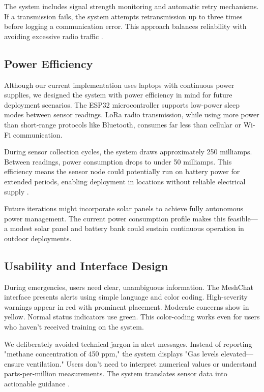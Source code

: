 The system includes signal strength monitoring and automatic retry mechanisms. If a transmission fails, the system attempts retransmission up to three times before logging a communication error. This approach balances reliability with avoiding excessive radio traffic \cite{adelantado2017understanding}.

\subsection{Power Efficiency}

Although our current implementation uses laptops with continuous power supplies, we designed the system with power efficiency in mind for future deployment scenarios. The ESP32 microcontroller supports low-power sleep modes between sensor readings. LoRa radio transmission, while using more power than short-range protocols like Bluetooth, consumes far less than cellular or Wi-Fi communication.

During sensor collection cycles, the system draws approximately 250 milliamps. Between readings, power consumption drops to under 50 milliamps. This efficiency means the sensor node could potentially run on battery power for extended periods, enabling deployment in locations without reliable electrical supply \cite{mekki2019comparative}.

Future iterations might incorporate solar panels to achieve fully autonomous power management. The current power consumption profile makes this feasible—a modest solar panel and battery bank could sustain continuous operation in outdoor deployments.

\subsection{Usability and Interface Design}

During emergencies, users need clear, unambiguous information. The MeshChat interface presents alerts using simple language and color coding. High-severity warnings appear in red with prominent placement. Moderate concerns show in yellow. Normal status indicators use green. This color-coding works even for users who haven't received training on the system.

We deliberately avoided technical jargon in alert messages. Instead of reporting "methane concentration of 450 ppm," the system displays "Gas levels elevated—ensure ventilation." Users don't need to interpret numerical values or understand parts-per-million measurements. The system translates sensor data into actionable guidance \cite{norman2013design}.

